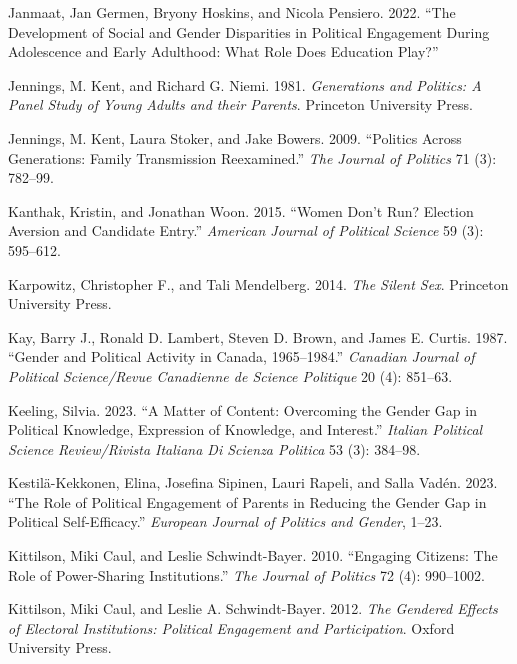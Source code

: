 \documentclass[
  letterpaper,
  DIV=11,
  numbers=noendperiod]{scrreprt}
\newlength{\cslhangindent}
\newenvironment{CSLReferences}[2] %
 {\begin{list}{}{%
  \setlength{\itemindent}{0pt}
  \setlength{\leftmargin}{0pt}
  \setlength{\parsep}{0pt}
  \ifodd #1
   \setlength{\leftmargin}{\cslhangindent}
   \setlength{\itemindent}{-1\cslhangindent}
  \fi
  \setlength{\itemsep}{#2\baselineskip}}}
 {\end{list}}
\begin{document}
\begin{CSLReferences}{1}{0}
Janmaat, Jan Germen, Bryony Hoskins, and Nicola Pensiero. 2022. {``{The
Development of Social and Gender Disparities in Political Engagement
During Adolescence and Early Adulthood: What Role Does Education
Play?}''}

Jennings, M. Kent, and Richard G. Niemi. 1981. \emph{{Generations and
Politics: A Panel Study of Young Adults and their Parents}}. Princeton
University Press.

Jennings, M. Kent, Laura Stoker, and Jake Bowers. 2009. {``{Politics
Across Generations: Family Transmission Reexamined}.''} \emph{The
Journal of Politics} 71 (3): 782--99.

Kanthak, Kristin, and Jonathan Woon. 2015. {``{Women Don't Run? Election
Aversion and Candidate Entry}.''} \emph{American Journal of Political
Science} 59 (3): 595--612.

Karpowitz, Christopher F., and Tali Mendelberg. 2014. \emph{{The Silent
Sex}}. Princeton University Press.

Kay, Barry J., Ronald D. Lambert, Steven D. Brown, and James E. Curtis.
1987. {``{Gender and Political Activity in Canada, 1965--1984}.''}
\emph{Canadian Journal of Political Science/Revue Canadienne de Science
Politique} 20 (4): 851--63.

Keeling, Silvia. 2023. {``{A Matter of Content: Overcoming the Gender
Gap in Political Knowledge, Expression of Knowledge, and Interest}.''}
\emph{Italian Political Science Review/Rivista Italiana Di Scienza
Politica} 53 (3): 384--98.

Kestilä-Kekkonen, Elina, Josefina Sipinen, Lauri Rapeli, and Salla
Vadén. 2023. {``{The Role of Political Engagement of Parents in Reducing
the Gender Gap in Political Self-Efficacy}.''} \emph{European Journal of
Politics and Gender}, 1--23.

Kittilson, Miki Caul, and Leslie Schwindt-Bayer. 2010. {``Engaging
Citizens: The Role of Power-Sharing Institutions.''} \emph{The Journal
of Politics} 72 (4): 990--1002.

Kittilson, Miki Caul, and Leslie A. Schwindt-Bayer. 2012. \emph{{The
Gendered Effects of Electoral Institutions: Political Engagement and
Participation}}. Oxford University Press.


\end{CSLReferences}
\end{document}
